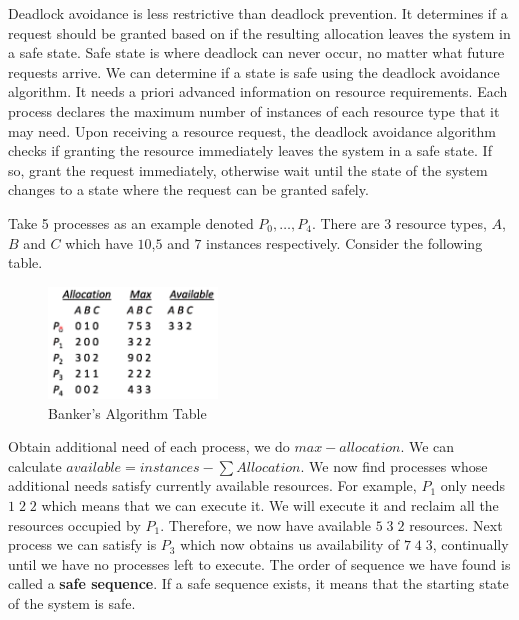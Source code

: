 \documentclass[a4paper]{article}
\theoremstyle{plain}
\theoremstyle{definition}
\newtheorem{defn}{Definition}[section]
\theoremstyle{remark}
\begin{document}
\begin{tcolorbox}[colback=black!3!white,colframe=black!60!white,title=\begin{defn}Deadlock Avoidance \label{Deadlock Avoidance}\end{defn}]
Deadlock avoidance is less restrictive than deadlock prevention. It determines if a request should be granted based on if the resulting allocation leaves the system in a safe state. Safe state is where deadlock can never occur, no matter what future requests arrive. We can determine if a state is safe using the deadlock avoidance algorithm. It needs a priori advanced information on resource requirements. Each process declares the maximum number of instances of each resource type that it may need. Upon receiving a resource request, the deadlock avoidance algorithm checks if granting the resource immediately leaves the system in a safe state. If so, grant the request immediately, otherwise wait until the state of the system changes to a state where the request can be granted safely. 
\end{tcolorbox}
\begin{tcolorbox}[colback=black!3!white,colframe=black!60!white,title=\begin{defn}Banker's Safety Algorithm \label{Banker's Safety Algorithm}\end{defn}]
Take 5 processes as an example denoted $P_0,\ldots,P_4$. There are 3 resource types, $A$, $B$ and $C$ which have $10$,$5$ and $7$ instances respectively. Consider the following table.
\begin{figure}[H]
	\centering
	\includegraphics[width=0.4\textwidth]{seventy.png}
	\caption{Banker's Algorithm Table}
	\label{fig:seventy-png}
\end{figure}
Obtain additional need of each process, we do $max-allocation$. We can calculate $available = instances - \sum Allocation$. We now find processes whose additional needs satisfy currently available resources. For example, $P_1$ only needs $1\;2\;2$ which means that we can execute it. We will execute it and reclaim all the resources occupied by $P_1$. Therefore, we now have available $5\;3\;2$ resources. Next process we can satisfy is $P_3$ which now obtains us availability of $7\;4\;3$, continually until we have no processes left to execute. The order of sequence we have found is called a \textbf{safe sequence}. If a safe sequence exists, it means that the starting state of the system is safe.
\end{tcolorbox}
\end{document}
